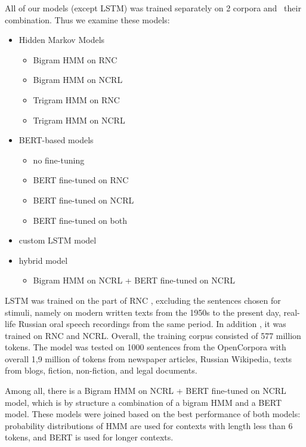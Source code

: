 \documentclass[a4paper]{article}
\begin{document}
All of our models (except LSTM) was trained separately on 2 corpora and  their combination. Thus we examine these models:

\begin{itemize}
	\item Hidden Markov Models
	\begin{itemize}
		\item Bigram HMM on RNC
		\item Bigram HMM on NCRL
		\item Trigram HMM on RNC
		\item Trigram HMM on NCRL
	\end{itemize}
	\item BERT-based models
	\begin{itemize}
		\item no fine-tuning
		\item BERT fine-tuned on RNC
		\item BERT fine-tuned on NCRL
		\item BERT fine-tuned on both
	\end{itemize}
	\item custom LSTM model
	\item hybrid model
	\begin{itemize}
		\item Bigram HMM on NCRL + BERT fine-tuned on NCRL
	\end{itemize}
\end{itemize}

LSTM was trained on the part of RNC
, excluding the sentences chosen for stimuli, namely on modern written texts from the 1950s to the present day, real-life Russian oral speech recordings from the same period. In addition
, it was trained on RNC and NCRL. Overall, the training corpus consisted of 577 million tokens. The model was tested on 1000 sentences from the OpenCorpora 
\cite{bocharov:2011}
with overall 1,9 million of tokens from newspaper articles, Russian Wikipedia, texts from blogs, fiction, non-fiction, and legal documents. 

Among all, there is a Bigram HMM on NCRL + BERT fine-tuned on NCRL model, which is by structure a combination of a bigram HMM and a BERT model. These models were joined based on the best performance of both models: probability distributions of HMM are used for contexts with length less than 6 tokens, and BERT is used for longer contexts. 
\end{document}
